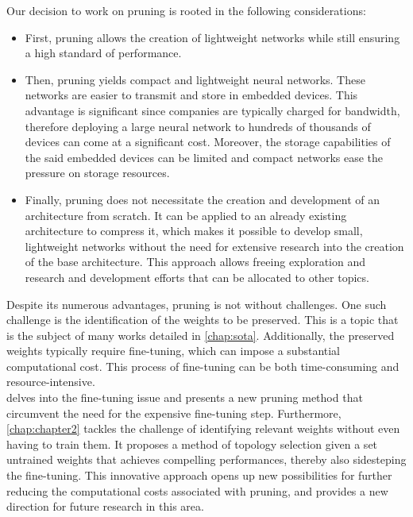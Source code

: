 \noindent Our decision to work on pruning is rooted in the following
considerations:
\begin{itemize}
  \item First, pruning allows the creation of lightweight networks while still
  ensuring a high standard of performance.

  \item Then, pruning yields compact and lightweight neural networks. These
  networks are easier to transmit and store in embedded devices. This advantage
  is significant since companies are typically charged for bandwidth, therefore
  deploying a large neural network to hundreds of thousands of devices can come
  at a significant cost. Moreover, the storage capabilities of the said embedded
  devices can be limited and compact networks ease the pressure on storage
  resources.
  
  \item  Finally, pruning does not necessitate the creation and development of
  an architecture from scratch. It can be applied to an already existing
  architecture to compress it, which makes it possible to develop small,
  lightweight networks without the need for extensive research into the creation
  of the base architecture. This approach allows freeing exploration and
  research and development efforts that can be allocated to other topics.

\end{itemize}

Despite its numerous advantages, pruning is not without challenges. One such
challenge is the identification of the weights to be preserved. This is a topic
that is the subject of many works detailed in \cref{chap:sota}. Additionally,
the preserved weights typically require fine-tuning, which can impose a
substantial computational cost. This process of fine-tuning can be both
time-consuming and resource-intensive.\\

 delves into the fine-tuning issue and presents a new
pruning method that circumvent the need for the expensive fine-tuning step.
Furthermore, \cref{chap:chapter2} tackles the challenge of identifying relevant
weights without even having to train them. It proposes a method of topology
selection given a set untrained weights that achieves compelling performances,
thereby also sidesteping the fine-tuning. This innovative approach opens up new
possibilities for further reducing the computational costs associated with
pruning, and provides a new direction for future research in this area.\\

